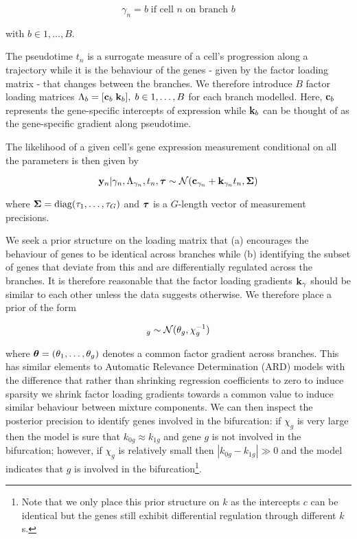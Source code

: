 \begin{equation}
\gamma_n = b \; \mbox{if cell $n$ on branch $b$}
\end{equation}

with $b \in 1,\ldots,B$.

The pseudotime $t_n$ is a surrogate measure of a cell's progression along a trajectory while it is the behaviour of the genes - given by the factor loading matrix - that changes between the branches. We therefore introduce $B$ factor loading matrices $\Lambda_b = [ {\bf c}_b \; {\bf k}_b], \; b \in 1, \ldots, B$ for each branch modelled. Here, ${\bf c}_b$ represents the gene-specific intercepts of expression while ${\bf k}_b$ can be thought of as the gene-specific gradient along pseudotime.


The likelihood of a given cell's gene expression measurement conditional on all the parameters is then given by %

\begin{equation}
{\bf y}_n | \gamma_n, \Lambda_{\gamma_n}, t_n, {\bm \tau}  \sim \mathcal{N}({\bf c}_{\gamma_n} + {\bf k}_{\gamma_n} t_n, \bm{\Sigma})
\end{equation}

where $\bm{\Sigma} = \text{diag}(\tau_1, \ldots, \tau_G)$ and ${\bm \tau}$ is a $G$-length vector of measurement precisions.

We seek a prior structure on the loading matrix that (a) encourages the behaviour of genes to be identical across branches while (b) identifying the subset of genes that deviate from this and are differentially regulated across the branches. It is therefore reasonable that the factor loading gradients ${\bf k}_\gamma$ should be similar to each other unless the data suggests otherwise. We therefore place a prior of the form

\begin{equation}
[\kgi]_g \sim \norm(\theta_g,  \chi^{-1}_g)
\end{equation}

where $\bm{\theta} = (\theta_1, \ldots, \theta_g)$ denotes a common factor gradient across branches. This has similar elements to Automatic Relevance Determination (ARD) models %
with the difference that rather than shrinking regression coefficients to zero to induce sparsity we shrink factor loading gradients towards a common value to induce similar behaviour between mixture components. We can then inspect the posterior precision %
to identify genes involved in the bifurcation: if $\chi_g$ is very large then the model is sure that $k_{0g} \approx k_{1g}$ and gene $g$ is not involved in the bifurcation; however, if $\chi_g$ is relatively small then $|k_{0g} - k_{1g}| \gg 0$ and the model indicates that $g$ is involved in the bifurcation\footnote{Note that we only place this prior structure on $k$ as the intercepts $c$ can be identical but the genes still exhibit differential regulation through different $k$s.}.

